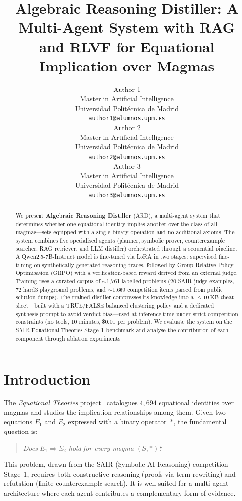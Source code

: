\documentclass{article}
\title{Algebraic Reasoning Distiller: A Multi-Agent System with RAG and RLVF for Equational Implication over Magmas}
\author{%
  Author 1 \\
  Master in Artificial Intelligence\\
  Universidad Polit\'ecnica de Madrid\\
  \texttt{author1@alumnos.upm.es} \\
  \And
  Author 2 \\
  Master in Artificial Intelligence\\
  Universidad Polit\'ecnica de Madrid\\
  \texttt{author2@alumnos.upm.es} \\
  \And
  Author 3 \\
  Master in Artificial Intelligence\\
  Universidad Polit\'ecnica de Madrid\\
  \texttt{author3@alumnos.upm.es} \\
}
\begin{document}
\maketitle

\begin{abstract}
We present \textbf{Algebraic Reasoning Distiller} (ARD), a multi-agent system that determines whether one equational identity implies another over the class of all magmas---sets equipped with a single binary operation and no additional axioms. The system combines five specialised agents (planner, symbolic prover, counterexample searcher, RAG retriever, and LLM distiller) orchestrated through a sequential pipeline. A Qwen2.5-7B-Instruct model is fine-tuned via LoRA in two stages: supervised fine-tuning on synthetically generated reasoning traces, followed by Group Relative Policy Optimisation (GRPO) with a verification-based reward derived from an external judge. Training uses a curated corpus of $\sim$1{,}761 labelled problems (20 SAIR judge examples, 72 hard3 playground problems, and $\sim$1{,}669 competition items parsed from public solution dumps). The trained distiller compresses its knowledge into a $\leq$10\,KB cheat sheet---built with a TRUE/FALSE balanced clustering policy and a dedicated synthesis prompt to avoid verdict bias---used at inference time under strict competition constraints (no tools, 10 minutes, \$0.01 per problem). We evaluate the system on the SAIR Equational Theories Stage~1 benchmark and analyse the contribution of each component through ablation experiments.
\end{abstract}

\section{Introduction}
\label{sec:intro}

The \textit{Equational Theories} project~\cite{teorth2024} catalogues $4{,}694$ equational identities over magmas and studies the implication relationships among them. Given two equations $E_1$ and $E_2$ expressed with a binary operator~$*$, the fundamental question is:

\begin{quote}
\itshape Does $E_1 \Rightarrow E_2$ hold for every magma $(S, *)$?
\end{quote}

This problem, drawn from the SAIR (Symbolic AI Reasoning) competition Stage~1, requires both constructive reasoning (proofs via term rewriting) and refutation (finite counterexample search). It is well suited for a multi-agent architecture where each agent contributes a complementary form of evidence.
\end{document}
